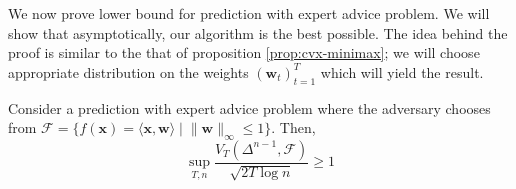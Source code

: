 \documentclass[12pt, a4paper]{report}
\begin{document}
We now prove lower bound for prediction with expert advice problem. We will show that asymptotically, our algorithm is the best possible. The idea behind the proof is similar to the that of proposition \ref{prop:cvx-minimax}; we will choose appropriate distribution on the weights $(\mathbf{w}_t)_{t=1}^T$ which will yield the result.
\begin{thm}\label{thm:expert-advice-lower-bound}
Consider a prediction with expert advice problem where the adversary chooses from $\mathcal{F} = \{f(\mathbf{x}) = \langle \mathbf{x}, \mathbf{w} \rangle \mid \lVert \mathbf{w} \rVert_{\infty} \leq 1 \}$. Then, 
\begin{equation*}
    \sup_{T, n} \frac{V_T(\Delta^{n-1}, \mathcal{F})}{\sqrt{2T \log n}} \geq 1
\end{equation*}
\end{thm}
\end{document}

